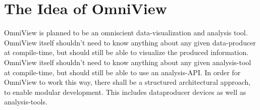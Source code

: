 \documentclass{scrreprt}
\begin{document}
\tableofcontents
\newpage 

\chapter{The Idea of OmniView}
OmniView is planned to be an omniscient data-visualization and analysis tool. 
OmniView itself shouldn't need to know anything about any given data-producer at compile-time, but should still be able to visualize the produced information.
OmniView itself shouldn't need to know anything about any given analysis-tool at compile-time, but should still be able to use an analysis-API. 
In order for OmniView to work this way, there shall be a structured architectural approach, to enable modular development.
This includes dataproducer devices as well as analysis-tools.
\end{document}
